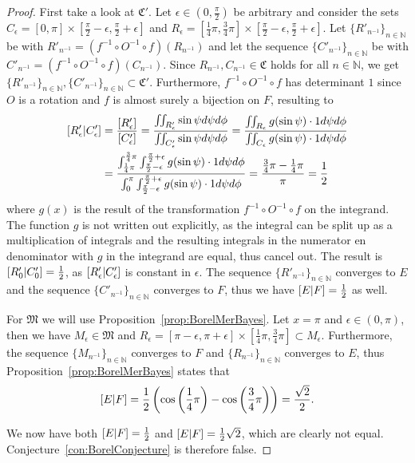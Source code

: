 \documentclass[a4paper]{report}
\theoremstyle{plain}
\theoremstyle{definition}
\theoremstyle{remark}
\numberwithin{equation}{chapter}
\newcommand{\N}{\mathbb{N}}
\let\P\relax
\DeclareMathOperator{\P}{\mathbb{P}}
\DeclareMathOperator{\1}{\mathbbm{1}}
\begin{document}
\begin{proof}
First take a look at $\mathfrak{C}'$. Let $\epsilon\in\left(0,\frac{\pi}{2}\right)$ be arbitrary and consider the sets $C_\epsilon=[0,\pi]\times\left[\frac{\pi}{2}-\epsilon,\frac{\pi}{2}+\epsilon\right]$ and $R_\epsilon=\left[\frac{1}{4}\pi,\frac{3}{4}\pi\right]\times\left[\frac{\pi}{2}-\epsilon,\frac{\pi}{2}+\epsilon\right]$. Let $\{R'_{n^{-1}}\}_{n\in\N}$ be with $R'_{n^{-1}}=(f^{-1}\circ O^{-1}\circ f)(R_{n^{-1}})$ and let the sequence $\{C'_{n^{-1}}\}_{n\in\N}$ be with $C'_{n^{-1}}=(f^{-1}\circ O^{-1}\circ f)(C_{n^{-1}})$. Since $R_{n^{-1}},C_{n^{-1}}\in\mathfrak{C}$ holds for all $n\in\N$, we get $\{R'_{n^{-1}}\}_{n\in\N},\{C'_{n^{-1}}\}_{n\in\N}\subset\mathfrak{C'}$. Furthermore, $f^{-1}\circ O^{-1}\circ f$ has determinant $1$ since $O$ is a rotation and $f$ is almost surely a bijection on $F$, resulting to
\begin{align}
\P[R'_\epsilon|C'_\epsilon]&=\frac{\P[R'_\epsilon]}{\P[C'_\epsilon]}=\frac{\iint_{R'_\epsilon}\sin\psi d\psi d\phi}{\iint_{C'_\epsilon} \sin\psi d\psi d\phi}=\frac{\iint_{R_\epsilon}g(\sin\psi)\cdot1 d\psi d\phi}{\iint_{C_\epsilon}g(\sin\psi)\cdot1d\psi d\phi}\\
&=\frac{\int_{\frac{1}{4}\pi}^{\frac{3}{4}\pi}\int_{\frac{\pi}{2}-\epsilon}^{\frac{\pi}{2}+\epsilon}g(\sin\psi)\cdot1 d\psi d\phi}{\int_{0}^{\pi}\int_{\frac{\pi}{2}-\epsilon}^{\frac{\pi}{2}+\epsilon}g(\sin\psi)\cdot1d\psi d\phi}=\frac{\frac{3}{4}\pi-\frac{1}{4}\pi}{\pi}=\frac{1}{2}
\end{align}
where $g(x)$ is the result of the transformation $f^{-1}\circ O^{-1}\circ f$ on the integrand. The function $g$ is not written out explicitly, as the integral can be split up as a multiplication of integrals and the resulting integrals in the numerator en denominator with $g$ in the integrand are equal, thus cancel out. The result is $\P[R'_0|C'_0]=\frac{1}{2}$, as $\P[R'_\epsilon|C'_\epsilon]$ is constant in $\epsilon$. The sequence $\{R'_{n^{-1}}\}_{n\in\N}$ converges to $E$ and the sequence $\{C'_{n^{-1}}\}_{n\in\N}$ converges to $F$, thus we have $\P[E|F]=\frac{1}{2}$ as well.

For $\mathfrak{M}$ we will use Proposition~\ref{prop:BorelMerBayes}. Let $x=\pi$ and $\epsilon\in(0,\pi)$, then we have $M_\epsilon\in\mathfrak{M}$ and $R_\epsilon=[\pi-\epsilon,\pi+\epsilon]\times\left[\frac{1}{4}\pi,\frac{3}{4}\pi\right]\subset M_\epsilon$. Furthermore, the sequence $\{M_{n^{-1}}\}_{n\in\N}$ converges to $F$ and $\{R_{n^{-1}}\}_{n\in\N}$ converges to $E$, thus Proposition~\ref{prop:BorelMerBayes} states that
\begin{equation}
\P[E|F]=\frac{1}{2}\left(\cos\left(\frac{1}{4}\pi\right)-\cos\left(\frac{3}{4}\pi\right)\right)=\frac{\sqrt{2}}{2}.
\end{equation}

We now have both $\P[E|F]=\frac{1}{2}$ and $\P[E|F]=\frac{1}{2}\sqrt{2}$, which are clearly not equal. Conjecture~\ref{con:BorelConjecture} is therefore false.
\end{proof}
\end{document}
